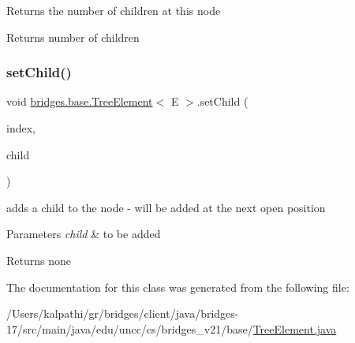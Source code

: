 Returns the number of children at this node

\begin{DoxyReturn}{Returns}
number of children 
\end{DoxyReturn}
\mbox{\label{classbridges_1_1base_1_1_tree_element_aefafebb19d64398d150e464e4361ddf0}} 
\subsubsection{\texorpdfstring{set\+Child()}{setChild()}}
{\footnotesize\ttfamily void \mbox{\hyperlink{classbridges_1_1base_1_1_tree_element}{bridges.\+base.\+Tree\+Element}}$<$ E $>$.set\+Child (\begin{DoxyParamCaption}\item[{int}]{index,  }\item[{\mbox{\hyperlink{classbridges_1_1base_1_1_tree_element}{Tree\+Element}}$<$ E $>$}]{child }\end{DoxyParamCaption})}

adds a child to the node -\/ will be added at the next open position


\begin{DoxyParams}{Parameters}
{\em child} & to be added\\
\hline
\end{DoxyParams}
\begin{DoxyReturn}{Returns}
none 
\end{DoxyReturn}


The documentation for this class was generated from the following file\+:\begin{DoxyCompactItemize}
\item 
/\+Users/kalpathi/gr/bridges/client/java/bridges-\/17/src/main/java/edu/uncc/cs/bridges\+\_\+v21/base/\mbox{\hyperlink{_tree_element_8java}{Tree\+Element.\+java}}\end{DoxyCompactItemize}
